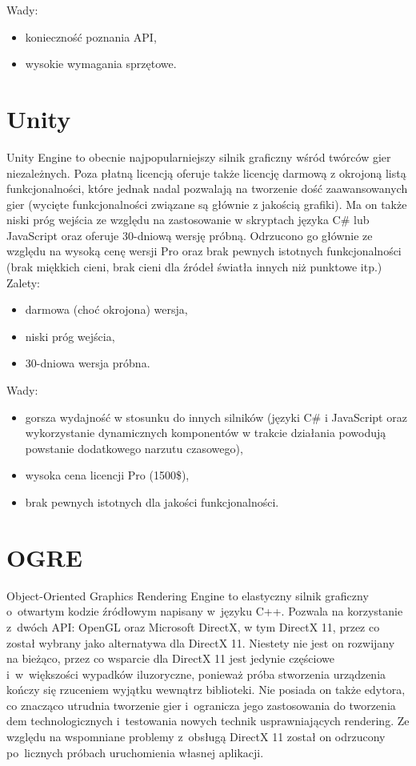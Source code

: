 Wady:
\begin{itemize}
\item konieczność poznania API,
\item wysokie wymagania sprzętowe.
\end{itemize}

\section{Unity}

Unity Engine to obecnie najpopularniejszy silnik graficzny wśród twórców gier niezależnych. Poza płatną licencją oferuje także licencję darmową z okrojoną listą funkcjonalności, które jednak nadal pozwalają na tworzenie dość zaawansowanych gier (wycięte funkcjonalności związane są głównie z jakością grafiki). Ma on także niski próg wejścia ze względu na zastosowanie w skryptach języka C\# lub JavaScript oraz oferuje 30-dniową wersję próbną. Odrzucono go głównie ze względu na wysoką cenę wersji Pro oraz brak pewnych istotnych funkcjonalności (brak miękkich cieni, brak cieni dla źródeł światła innych niż punktowe itp.)\\

Zalety:
\begin{itemize}
\item darmowa (choć okrojona) wersja,
\item niski próg wejścia,
\item 30-dniowa wersja próbna.
\end{itemize}

Wady:
\begin{itemize}
\item gorsza wydajność w stosunku do innych silników (języki C\# i JavaScript oraz wykorzystanie dynamicznych komponentów w trakcie działania powodują powstanie dodatkowego narzutu czasowego),
\item wysoka cena licencji Pro (1500\$),
\item brak pewnych istotnych dla jakości funkcjonalności.
\end{itemize}

\section{OGRE}

Object-Oriented Graphics Rendering Engine to elastyczny silnik graficzny o~otwartym kodzie źródłowym napisany w~języku C++. Pozwala na korzystanie z~dwóch API: OpenGL oraz Microsoft DirectX, w tym DirectX 11, przez co został wybrany jako alternatywa dla DirectX 11. Niestety nie jest on rozwijany na bieżąco, przez co wsparcie dla DirectX 11 jest jedynie częściowe i~w~większości wypadków iluzoryczne, ponieważ próba stworzenia urządzenia kończy się rzuceniem wyjątku wewnątrz biblioteki. Nie posiada on także edytora, co znacząco utrudnia tworzenie gier i~ogranicza jego zastosowania do tworzenia dem technologicznych i~testowania nowych technik usprawniających rendering. Ze względu na wspomniane problemy z~obsługą DirectX 11 został on odrzucony po~licznych próbach uruchomienia własnej aplikacji.\\

